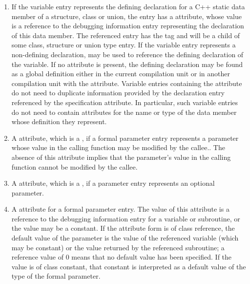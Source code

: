 \begin{enumerate}[1.]
\item If the variable entry represents the defining declaration
for a C++ static data member of a structure, class or union,
the entry has a  attribute, whose value is a
reference to the debugging information entry representing the
declaration of this data member. The referenced entry has the
tag  and will be a child of some class, structure
or union type entry.  If the variable entry represents a
non-defining declaration,  may be used
to reference the defining declaration of the variable. If
no  attribute is present, the defining
declaration may be found as a global definition either in the
current compilation unit or in another compilation unit with
the  attribute.  Variable entries containing
the  attribute do not need to duplicate
information provided by the declaration entry referenced by
the specification attribute. In particular, such variable
entries do not need to contain attributes for the name or
type of the data member whose definition they represent.

\item A  attribute, 
which is a ,
if a formal parameter entry represents a parameter whose
value in the calling function may be modified by the callee..
The absence of this attribute implies that the parameter’s
value in the calling function cannot be modified by the callee.

\item A  attribute, 
which is a , if a
parameter entry represents an optional parameter.

\item A  attribute for a formal parameter
entry. The value of this attribute is a reference to the
debugging information entry for a variable or subroutine,
or the value may be a constant. If the attribute form is of
class reference, the default value of the parameter is the
value of the referenced variable (which may be constant) or
the value returned by the referenced subroutine; a reference
value of 0 means that no default value has been specified.
If the value is of class constant, that constant is interpreted
as a default value of the type of the formal parameter.


\end{enumerate}
